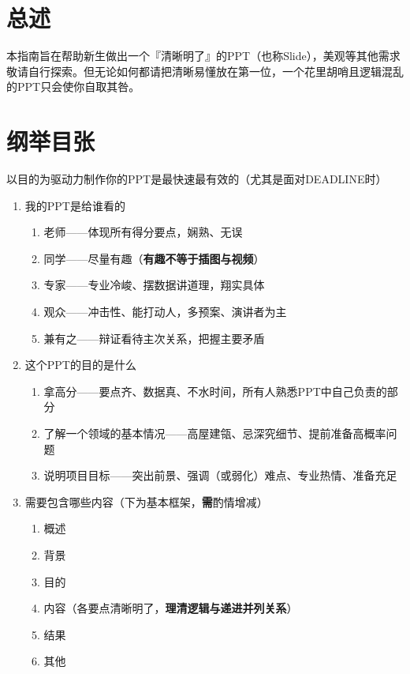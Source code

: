 \section[总述]{总述}
本指南旨在帮助新生做出一个『清晰明了』的PPT（也称Slide），美观等其他需求敬请自行探索。但无论如何都请把清晰易懂放在第一位，一个花里胡哨且逻辑混乱的PPT只会使你自取其咎。

\section[纲举目张]{纲举目张}
以目的为驱动力制作你的PPT是最快速最有效的（尤其是面对DEADLINE时）
\begin{enumerate}
    \item 我的PPT是给谁看的
          \begin{enumerate}
              \item 老师——体现所有得分要点，娴熟、无误
              \item 同学——尽量有趣（\textbf{有趣不等于插图与视频}）
              \item 专家——专业冷峻、摆数据讲道理，翔实具体
              \item 观众——冲击性、能打动人，多预案、演讲者为主
              \item 兼有之——辩证看待主次关系，把握主要矛盾
          \end{enumerate}
    \item 这个PPT的目的是什么
          \begin{enumerate}
              \item 拿高分——要点齐、数据真、不水时间，所有人熟悉PPT中自己负责的部分
              \item 了解一个领域的基本情况——高屋建瓴、忌深究细节、提前准备高概率问题
              \item 说明项目目标——突出前景、强调（或弱化）难点、专业热情、准备充足
          \end{enumerate}
    \item 需要包含哪些内容（下为基本框架，\textbf{需}酌情增减）
          \begin{enumerate}
              \item 概述
              \item 背景
              \item 目的
              \item 内容（各要点清晰明了，\textbf{理清逻辑与递进并列关系}）
              \item 结果
              \item 其他
          \end{enumerate}

\end{enumerate}

